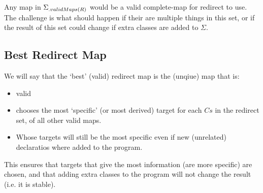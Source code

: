 Any map in $\Sigma{\ensuremath{{}_{.{validMaps}({R})}}}$ would be a valid complete-map for redirect to use. The challenge is what should happen if their are multiple things in this set, or if the result of this set could change if extra classes are added to $\Sigma$.

\subsection {Best Redirect Map}
We will say that the `best' (valid) redirect map is the (unqiue) map that is:
\begin{itemize}
	\item valid
	\item chooses the most `specific' (or most derived) target for each $Cs$ in the redirect set, of all other valid maps.
	\item Whose targets will still be the most specific even if new (unrelated) declaratios where added to the program.
\end{itemize}

This ensures that targets that give the most information (are more specific) are chosen, and that adding extra classes to the program will not change the result (i.e. it is stable).


\begin{defs}
	
	
	

{}
	
	
	
	
\end{defs}

